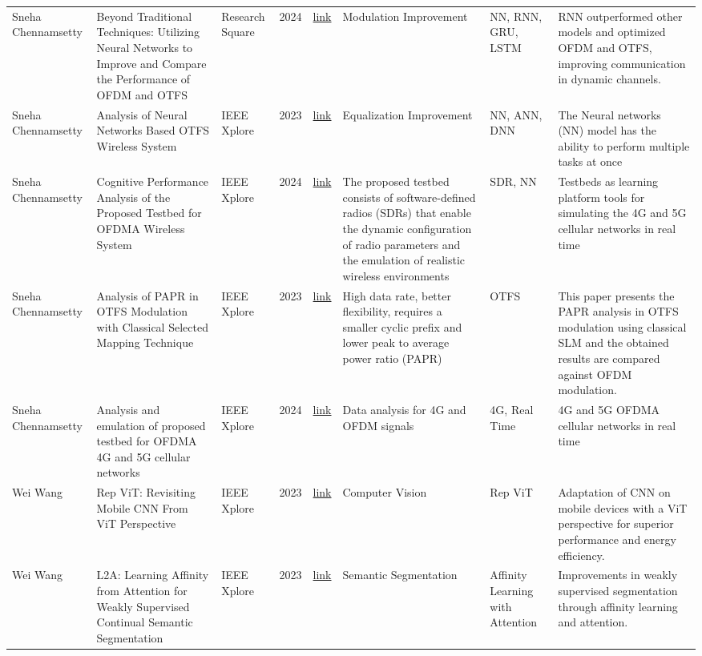 \begin{landscape}
\begin{longtable}{p{2.0cm} p{4cm} p{1.0cm} p{1.0cm} p{3.0cm} p{3cm} p{2.0cm} p{3.0cm}}
        \endlastfoot
        Sneha Chennamsetty & Beyond Traditional Techniques: Utilizing Neural Networks to Improve and Compare the Performance of OFDM and OTFS & Research Square & 2024 & \href{https://doi.org/10.21203/rs.3.rs-5017954/v1}{link} & Modulation Improvement & NN, RNN, GRU, LSTM & RNN outperformed other models and optimized OFDM and OTFS, improving communication in dynamic channels. \\
        Sneha Chennamsetty & Analysis of Neural Networks Based OTFS Wireless System & IEEE Xplore & 2023 & \href{https://ieeexplore.up.elogim.com/document/10331412}{link} & Equalization Improvement & NN, ANN, DNN & The Neural networks (NN) model has the ability to perform multiple tasks at once \\
        Sneha Chennamsetty & Cognitive Performance Analysis of the Proposed Testbed for OFDMA Wireless System & IEEE Xplore & 2024 & \href{https://ieeexplore.up.elogim.com/document/10391945}{link} & The proposed testbed consists of software-defined radios (SDRs) that enable the dynamic configuration of radio parameters and the emulation of realistic wireless environments & SDR, NN & Testbeds as learning platform tools for simulating the 4G and 5G cellular networks in real time \\
        Sneha Chennamsetty & Analysis of PAPR in OTFS Modulation with Classical Selected Mapping Technique & IEEE Xplore & 2023 & \href{https://ieeexplore.ieee.org/abstract/document/10041313}{link} & High data rate, better flexibility, requires a smaller cyclic prefix and lower peak to average power ratio (PAPR) & OTFS & This paper presents the PAPR analysis in OTFS modulation using classical SLM and the obtained results are compared against OFDM modulation. \\
        Sneha Chennamsetty & Analysis and emulation of proposed testbed for OFDMA 4G and 5G cellular networks & IEEE Xplore & 2024 & \href{https://onlinelibrary.wiley.com/doi/abs/10.1002/dac.5794}{link} & Data analysis for 4G and OFDM signals & 4G, Real Time & 4G and 5G OFDMA cellular networks in real time \\
        Wei Wang & Rep ViT: Revisiting Mobile CNN From ViT Perspective & IEEE Xplore & 2023 & \href{https://ieeexplore.ieee.org/document/10359437}{link} & Computer Vision & Rep ViT & Adaptation of CNN on mobile devices with a ViT perspective for superior performance and energy efficiency. \\
        Wei Wang & L2A: Learning Affinity from Attention for Weakly Supervised Continual Semantic Segmentation & IEEE Xplore & 2023 & \href{https://ieeexplore.ieee.org/document/10246306}{link} & Semantic Segmentation & Affinity Learning with Attention & Improvements in weakly supervised segmentation through affinity learning and attention. \\

\end{longtable}
\end{landscape}
